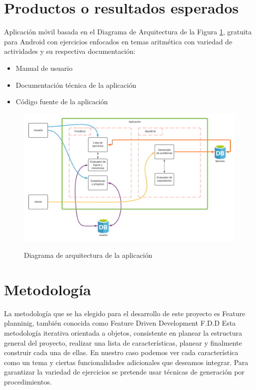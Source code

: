 \documentclass{article}
\begin{document}
\section{Productos o resultados esperados}
Aplicación móvil basada en el Diagrama de Arquitectura de la Figura \ref{fig:arquitectura}, 
gratuita para Android con ejercicios enfocados en temas aritmética con variedad de 
actividades y su respectiva documentación:
\begin{itemize}
	\item Manual de usuario
	\item Documentación técnica de la aplicación
	\item Código fuente de la aplicación
\end{itemize}

\begin{figure}[H]
\centering
\includegraphics[width=1\textwidth]{img/diagrama_arquitectura.png}\\
\caption{Diagrama de arquitectura de la aplicación}
\label{fig:arquitectura}
\end{figure}



\section{Metodología}
La metodología que se ha elegido para el desarrollo de este proyecto es Feature planninig\cite{hunt2006feature}, 
también conocida como Feature Driven Development F.D.D Esta metodología iterativa 
orientada a objetos, consistente en planear la estructura general del proyecto, 
realizar una lista de características, planear y finalmente construir cada una de ellas. 
En nuestro caso podemos ver cada característica como un tema y ciertas funcionalidades 
adicionales que deseamos integrar. Para garantizar la variedad de ejercicios se pretende 
usar técnicas de generación por procedimientos.
\end{document}
